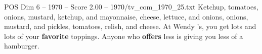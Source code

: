 \begin{textsample}{POS Dim 6 – 1970 – Score 2.00 – 1970/tv\_com\_1970\_25.txt}  \label{ex:f6_pos_032}
Ketchup, tomatoes, onions, mustard, ketchup, and mayonnaise, cheese, lettuce, and onions, onions, mustard, and pickles, tomatoes, relish, and cheese.
At Wendy 's, you get lots and lots of your \textbf{favorite} toppings.
Anyone who \textbf{offers} less is giving you less of a hamburger.

\end{textsample}
